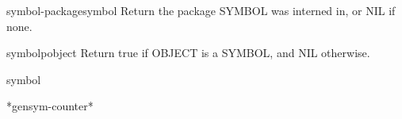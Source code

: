\begin{function}{symbol-package}{symbol}{}{}
  Return the package SYMBOL was interned in, or NIL if none.
\end{function}

\begin{function}{symbolp}{object}{}{}
  Return true if OBJECT is a SYMBOL, and NIL otherwise.
\end{function}

\begin{class}{symbol}{}{}{}
  
\end{class}

\begin{variable}{*gensym-counter*}{}{}{}
  
\end{variable}

